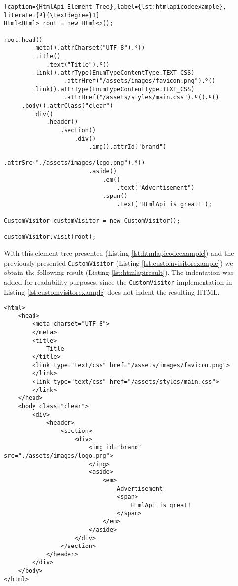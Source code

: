 \begin{minipage}{\linewidth}
\begin{lstlisting}[caption={HtmlApi Element Tree},label={lst:htmlapicodeexample}, literate={º}{\textdegree}1]
Html<Html> root = new Html<>();

root.head()
        .meta().attrCharset("UTF-8").º()
        .title()
            .text("Title").º()
        .link().attrType(EnumTypeContentType.TEXT_CSS)
                 .attrHref("/assets/images/favicon.png").º()
        .link().attrType(EnumTypeContentType.TEXT_CSS)
                 .attrHref("/assets/styles/main.css").º().º()
     .body().attrClass("clear")
        .div()
            .header()
                .section()
                    .div()
                        .img().attrId("brand")
                                .attrSrc("./assets/images/logo.png").º()
                        .aside()
                            .em()
                                .text("Advertisement")
                            .span()
                                .text("HtmlApi is great!");
                                    
CustomVisitor customVisitor = new CustomVisitor();
    
customVisitor.visit(root);
\end{lstlisting}
\end{minipage}

\noindent
With this element tree presented (Listing \ref{lst:htmlapicodeexample}) and the previously presented \texttt{CustomVisitor} (Listing \ref{lst:customvisitorexample}) we obtain the following result (Listing \ref{lst:htmlapiresult}). The indentation was added for readability purposes, since the \texttt{CustomVisitor} implementation in Listing \ref{lst:customvisitorexample} does not indent the resulting \ac{HTML}.

\bigskip


\begin{minipage}{\linewidth}
\begin{lstlisting}[caption={HtmlApi Visitor Result},label={lst:htmlapiresult}]
<html>
    <head>
        <meta charset="UTF-8">
        </meta>
        <title>
            Title
        </title>
        <link type="text/css" href="/assets/images/favicon.png">
        </link>
        <link type="text/css" href="/assets/styles/main.css">
        </link>
    </head>
    <body class="clear">
        <div>
            <header>
                <section>
                    <div>
                        <img id="brand" src="./assets/images/logo.png">
                        </img>
                        <aside>
                            <em>
                                Advertisement
                                <span>
                                    HtmlApi is great!
                                </span>
                            </em>
                        </aside>
                    </div>
                </section>
            </header>
        </div>
    </body>
</html>                          
\end{lstlisting}
\end{minipage}

